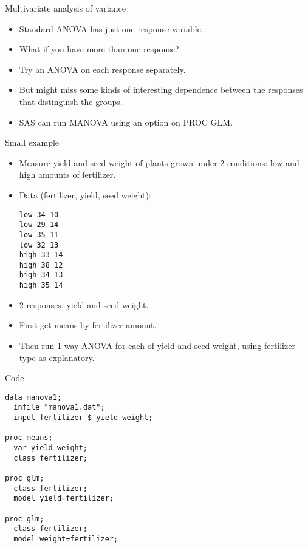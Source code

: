 \documentclass[pdf]{prosper}
\begin{document}
\begin{slide}{Multivariate analysis of variance}

  \begin{itemize}
  \item Standard ANOVA has just one response variable.
  \item What if you have more than one response?
  \item Try an ANOVA on each response separately.
  \item But might miss some kinds of interesting dependence between the responses that distinguish the groups.
  \item SAS can run MANOVA using an option on PROC GLM.
  \end{itemize}
  
\end{slide}

\begin{slide}{Small example}

  \begin{itemize}
  \item Measure yield and seed weight of plants grown under 2 conditions: low and high amounts of fertilizer.
  \item Data (fertilizer, yield, seed weight):
\begin{verbatim}
low 34 10
low 29 14
low 35 11
low 32 13
high 33 14
high 38 12
high 34 13
high 35 14

\end{verbatim}
  \item 2 responses, yield and seed weight.
  \item First get means by fertilizer amount.
  \item Then run 1-way ANOVA for each of yield and seed weight, using fertilizer type as explanatory.
  \end{itemize}
  
\end{slide}

\begin{slide}{Code}

\begin{verbatim}
data manova1;
  infile "manova1.dat";
  input fertilizer $ yield weight;

proc means;
  var yield weight;
  class fertilizer;

proc glm;
  class fertilizer;
  model yield=fertilizer;

proc glm;
  class fertilizer;
  model weight=fertilizer;

\end{verbatim}
  
\end{slide}
\end{document}
